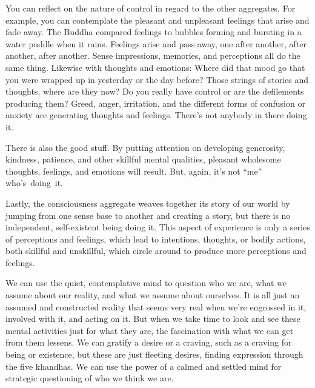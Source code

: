 You can reflect on the nature of control in regard to the other aggregates. For example, you can contemplate the pleasant and unpleasant feelings that arise and fade away. The Buddha compared feelings to bubbles forming and bursting in a water puddle when it rains. Feelings arise and pass away, one after another, after another, after another. Sense impressions, memories, and perceptions all do the same thing. Likewise with thoughts and emotions: Where did that mood go that you were wrapped up in yesterday or the day before? Those strings of stories and thoughts, where are they now? Do you really have control or are the defilements producing them? Greed, anger, irritation, and the different forms of confusion or anxiety are generating thoughts and feelings. There's not anybody in there doing it.

There is also the good stuff. By putting attention on developing generosity, kindness, patience, and other skillful mental qualities, pleasant wholesome thoughts, feelings, and emotions will result. But, again, it's not ``me'' \mbox{who's doing it.}

Lastly, the consciousness aggregate weaves together its story of our world by jumping from one sense base to another and creating a story, but there is no independent, self-existent being doing it. This aspect of experience is only a series of perceptions and feelings, which lead to intentions, thoughts, or bodily actions, both skillful and unskillful, which circle around to produce more perceptions and feelings.

We can use the quiet, contemplative mind to question who we are, what we assume about our reality, and what we assume about ourselves. It is all just an assumed and constructed reality that seems very real when we're engrossed in it, involved with it, and acting on it. But when we take time to look and see these mental activities just for what they are, the fascination with what we can get from them lessens. We can gratify a desire or a craving, such as a craving for being or existence, but these are just fleeting desires, finding expression through the five khandhas. We can use the power of a calmed and settled mind for strategic questioning of who we think we are.

